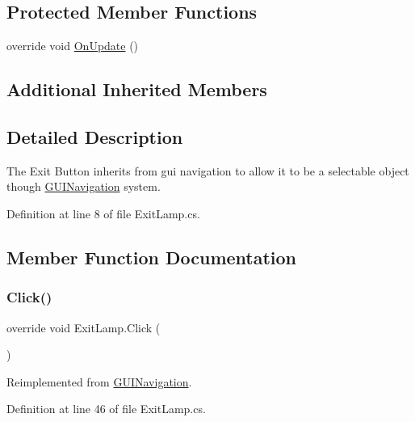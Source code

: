 \subsection*{Protected Member Functions}
\begin{DoxyCompactItemize}
\item 
override void \mbox{\hyperlink{class_exit_lamp_a74a35c513b3bea3104cde1c9b7687b52}{On\+Update}} ()
\end{DoxyCompactItemize}
\subsection*{Additional Inherited Members}


\subsection{Detailed Description}
The Exit Button inherits from gui navigation to allow it to be a selectable object though \mbox{\hyperlink{class_g_u_i_navigation}{G\+U\+I\+Navigation}} system. 



Definition at line 8 of file Exit\+Lamp.\+cs.



\subsection{Member Function Documentation}
\mbox{\label{class_exit_lamp_ae9f16c3c4507fc9eecb5fc4b0e225a6b}} 
\subsubsection{\texorpdfstring{Click()}{Click()}}
{\footnotesize\ttfamily override void Exit\+Lamp.\+Click (\begin{DoxyParamCaption}{ }\end{DoxyParamCaption})\hspace{0.3cm}{\ttfamily [virtual]}}



Reimplemented from \mbox{\hyperlink{class_g_u_i_navigation_a175178a8bf2832e74c13f83bf8e8f714}{G\+U\+I\+Navigation}}.



Definition at line 46 of file Exit\+Lamp.\+cs.

\mbox{\label{class_exit_lamp_a7c1aeebd12704ebac65f5e2cd5564542}} 

